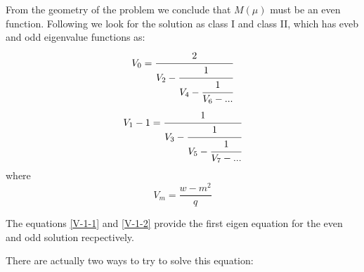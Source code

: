 From the geometry of the problem we conclude that $ M(\mu) $ must be an even function.  Following \cite{Mathieu4} we look for the solution as class I and class II, which has eveb and odd eigenvalue functions as:
\begin{equation}
\begin{split}
V_0 = \cfrac{2}{V_2 - \cfrac{1}{V_4 - \cfrac{1}{V_6 - ...}}}\label{V-1-1}
\end{split}
\end{equation}
\begin{equation}
\begin{split}
V_1 - 1 = \cfrac{1}{V_3 - \cfrac{1}{V_5 - \cfrac{1}{V_7 - ...}}}\label{V-1-2}
\end{split}
\end{equation}
where 
\begin{equation}
V_m = \frac{w - m^2}{q}
\end{equation}

The equations \ref{V-1-1} and \ref{V-1-2} provide the first eigen equation for the even and odd solution recpectively.

There are actually two ways to try to solve this equation:

